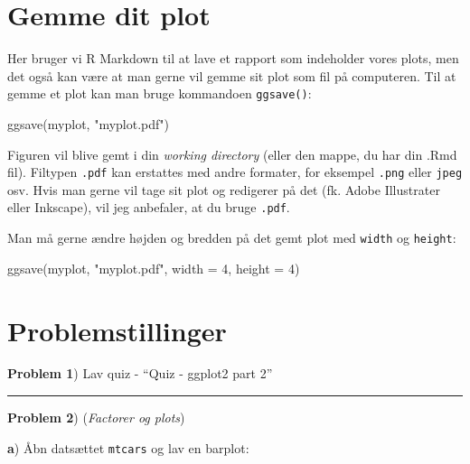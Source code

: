 \documentclass[
]{book}
\newenvironment{Shaded}{\begin{snugshade}}{\end{snugshade}}
\newcommand{\AttributeTok}[1]{\textcolor[rgb]{0.77,0.63,0.00}{#1}}
\newcommand{\DecValTok}[1]{\textcolor[rgb]{0.00,0.00,0.81}{#1}}
\newcommand{\FunctionTok}[1]{\textcolor[rgb]{0.00,0.00,0.00}{#1}}
\newcommand{\NormalTok}[1]{#1}
\newcommand{\StringTok}[1]{\textcolor[rgb]{0.31,0.60,0.02}{#1}}
\begin{document}
\hypertarget{gemme-dit-plot}{%
\section{Gemme dit plot}\label{gemme-dit-plot}}

Her bruger vi R Markdown til at lave et rapport som indeholder vores plots, men det også kan være at man gerne vil gemme sit plot som fil på computeren. Til at gemme et plot kan man bruge kommandoen \texttt{ggsave()}:

\begin{Shaded}
\begin{Highlighting}[]
\FunctionTok{ggsave}\NormalTok{(myplot, }\StringTok{"myplot.pdf"}\NormalTok{)}
\end{Highlighting}
\end{Shaded}

Figuren vil blive gemt i din \emph{working directory} (eller den mappe, du har din .Rmd fil). Filtypen \texttt{.pdf} kan erstattes med andre formater, for eksempel \texttt{.png} eller \texttt{jpeg} osv. Hvis man gerne vil tage sit plot og redigerer på det (fk. Adobe Illustrater eller Inkscape), vil jeg anbefaler, at du bruge \texttt{.pdf}.

Man må gerne ændre højden og bredden på det gemt plot med \texttt{width} og \texttt{height}:

\begin{Shaded}
\begin{Highlighting}[]
\FunctionTok{ggsave}\NormalTok{(myplot, }\StringTok{"myplot.pdf"}\NormalTok{, }\AttributeTok{width =} \DecValTok{4}\NormalTok{, }\AttributeTok{height =} \DecValTok{4}\NormalTok{)}
\end{Highlighting}
\end{Shaded}

\hypertarget{problemstillinger-3}{%
\section{Problemstillinger}\label{problemstillinger-3}}

\textbf{Problem 1}) Lav quiz - ``Quiz - ggplot2 part 2''

\begin{center}\rule{0.5\linewidth}{0.5pt}\end{center}

\textbf{Problem 2}) (\emph{Factorer og plots})

\textbf{a}) Åbn datsættet \texttt{mtcars} og lav en barplot:
\end{document}
